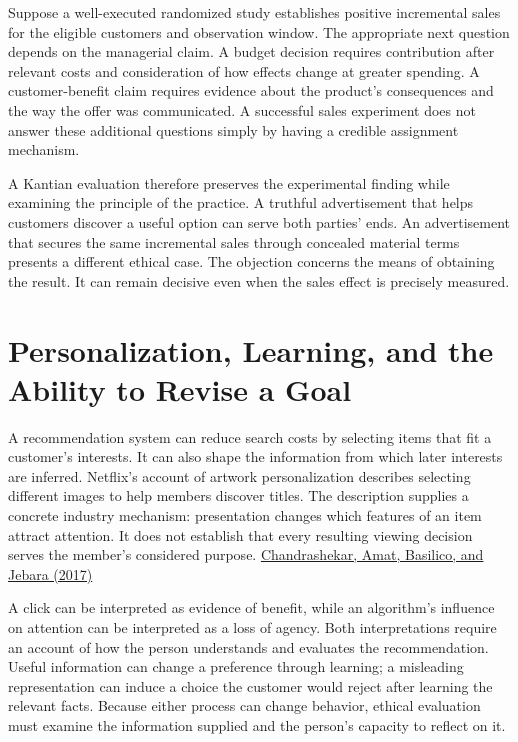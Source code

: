 Suppose a well-executed randomized study establishes positive
incremental sales for the eligible customers and observation window. The
appropriate next question depends on the managerial claim. A budget
decision requires contribution after relevant costs and consideration of
how effects change at greater spending. A customer-benefit claim
requires evidence about the product's consequences and the way the offer
was communicated. A successful sales experiment does not answer these
additional questions simply by having a credible assignment mechanism.

A Kantian evaluation therefore preserves the experimental finding while
examining the principle of the practice. A truthful advertisement that
helps customers discover a useful option can serve both parties' ends.
An advertisement that secures the same incremental sales through
concealed material terms presents a different ethical case. The
objection concerns the means of obtaining the result. It can remain
decisive even when the sales effect is precisely measured.


\hypertarget{M09-personalization-learning-and-the-ability-to-revise-a-goal}{%
\section{Personalization, Learning, and the Ability to Revise a
Goal}\label{M09-personalization-learning-and-the-ability-to-revise-a-goal}}

\noindent \noindent A recommendation system can reduce search costs by selecting
items that fit a customer's interests. It can also shape the information
from which later interests are inferred. Netflix's account of artwork
personalization describes selecting different images to help members
discover titles. The description supplies a concrete industry mechanism:
presentation changes which features of an item attract attention. It
does not establish that every resulting viewing decision serves the
member's considered purpose.
\href{https://netflixtechblog.com/artwork-personalization-c589f074ad76}{Chandrashekar,
Amat, Basilico, and Jebara (2017)}

A click can be interpreted as evidence of benefit, while an algorithm's
influence on attention can be interpreted as a loss of agency. Both
interpretations require an account of how the person understands and
evaluates the recommendation. Useful information can change a preference
through learning; a misleading representation can induce a choice the
customer would reject after learning the relevant facts. Because either
process can change behavior, ethical evaluation must examine the
information supplied and the person's capacity to reflect on it.


